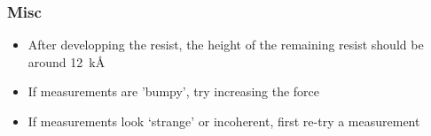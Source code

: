 \subsubsection{Misc}
\begin{itemize}
\item After developping the resist, the height of the remaining resist should be around \SI{12}{\kilo\angstrom}
\item If measurements are 'bumpy', try increasing the force
\item If measurements look `strange' or incoherent, first re-try a measurement
\end{itemize}
\newpage

